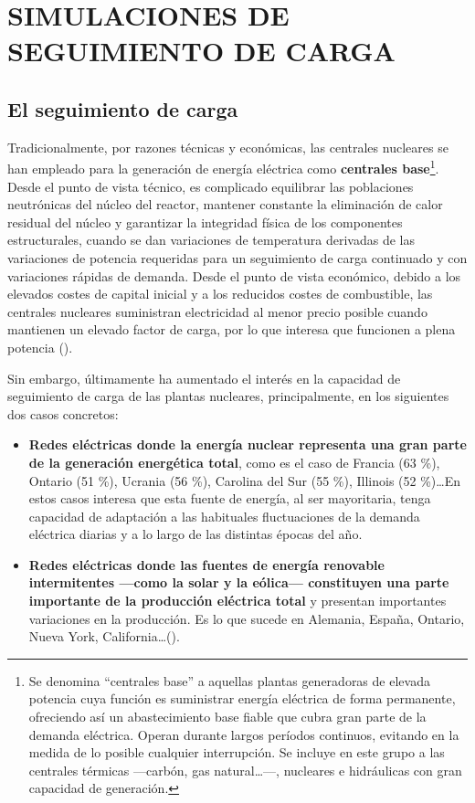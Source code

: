 \newpage
\section{SIMULACIONES DE SEGUIMIENTO DE CARGA} \label{simulaciones_seguimiento_de_carga}

\subsection{El seguimiento de carga} \label{seguimiento_de_carga}

Tradicionalmente, por razones técnicas y económicas, las centrales nucleares se han empleado para la generación de energía eléctrica como \textbf{centrales base}\footnote{Se denomina ``centrales base'' a aquellas plantas generadoras de elevada potencia cuya función es suministrar energía eléctrica de forma permanente, ofreciendo así un abastecimiento base fiable que cubra gran parte de la demanda eléctrica. Operan durante largos períodos continuos, evitando en la medida de lo posible cualquier interrupción. Se incluye en este grupo a las centrales térmicas ---carbón, gas natural\dots---, nucleares e hidráulicas con gran capacidad de generación.}. Desde el punto de vista técnico, es complicado equilibrar las poblaciones neutrónicas del núcleo del reactor, mantener constante la eliminación de calor residual del núcleo y garantizar la integridad física de los componentes estructurales, cuando se dan variaciones de temperatura derivadas de las variaciones de potencia requeridas para un seguimiento de carga continuado y con variaciones rápidas de demanda. Desde el punto de vista económico, debido a los elevados costes de capital inicial y a los reducidos costes de combustible, las centrales nucleares suministran electricidad al menor precio posible cuando mantienen un elevado \gls{factor de carga}, por lo que interesa que funcionen a plena potencia (\cite{stanford_load_following}).

Sin embargo, últimamente ha aumentado el interés en la capacidad de seguimiento de carga de las plantas nucleares, principalmente, en los siguientes dos casos concretos:

\begin{itemize}
  \item \textbf{Redes eléctricas donde la energía nuclear representa una gran parte de la generación energética total}, como es el caso de Francia (63 \%), Ontario (51 \%), Ucrania (56 \%), Carolina del Sur (55 \%), Illinois (52 \%)\dots  En estos casos interesa que esta fuente de energía, al ser mayoritaria, tenga capacidad de adaptación a las habituales fluctuaciones de la demanda eléctrica diarias y a lo largo de las distintas épocas del año.
  \item \textbf{Redes eléctricas donde las fuentes de energía renovable intermitentes ---como la solar y la eólica--- constituyen una parte importante de la producción eléctrica total} y presentan importantes variaciones en la producción. Es lo que sucede en Alemania, España, Ontario, Nueva York, California\dots (\cite{ANS_2019}).
\end{itemize} 


